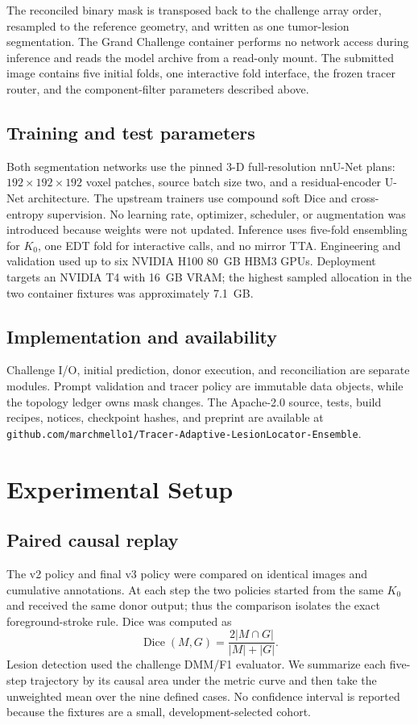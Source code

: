 \documentclass[runningheads]{llncs}
\begin{document}
The reconciled binary mask is transposed back to the challenge array order,
resampled to the reference geometry, and written as one tumor-lesion
segmentation. The Grand Challenge container performs no network access during
inference and reads the model archive from a read-only mount. The submitted
image contains five initial folds, one interactive fold interface, the frozen
tracer router, and the component-filter parameters described above.

\subsection{Training and test parameters}

Both segmentation networks use the pinned 3-D full-resolution nnU-Net plans:
$192\times192\times192$ voxel patches, source batch size two, and a
residual-encoder U-Net architecture. The upstream trainers use compound soft
Dice and cross-entropy supervision. No learning rate, optimizer, scheduler, or
augmentation was introduced because weights were not updated. Inference uses
five-fold ensembling for $K_0$, one EDT fold for interactive calls, and no
mirror TTA. Engineering and validation used up to six NVIDIA H100 80~GB HBM3
GPUs. Deployment targets an NVIDIA T4 with 16~GB VRAM; the highest sampled
allocation in the two container fixtures was approximately 7.1~GB.

\subsection{Implementation and availability}

Challenge I/O, initial prediction, donor execution, and reconciliation are
separate modules. Prompt validation and tracer policy are immutable data
objects, while the topology ledger owns mask changes. The Apache-2.0 source,
tests, build recipes, notices, checkpoint hashes, and preprint are available at
\texttt{github.com/marchmello1/Tracer-Adaptive-LesionLocator-Ensemble}.

\section{Experimental Setup}

\subsection{Paired causal replay}

The v2 policy and final v3 policy were compared on identical images and
cumulative annotations. At each step the two policies started from the same
$K_0$ and received the same donor output; thus the comparison isolates the
exact foreground-stroke rule. Dice was computed as
\begin{equation}
\operatorname{Dice}(M,G)=\frac{2|M\cap G|}{|M|+|G|}.
\end{equation}
Lesion detection used the challenge DMM/F1 evaluator. We summarize each
five-step trajectory by its causal area under the metric curve and then take
the unweighted mean over the nine defined cases. No confidence interval is
reported because the fixtures are a small, development-selected cohort.
\end{document}
